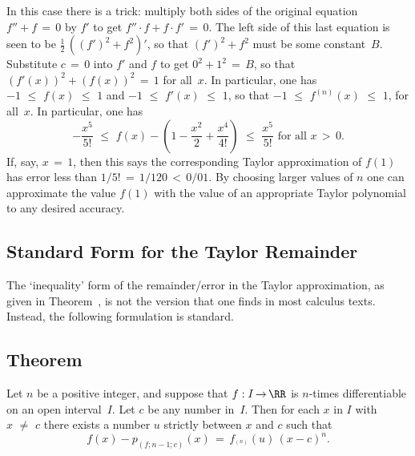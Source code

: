         In this case there is a trick: multiply both sides of the original equation $f'' + f \,=\, 0$ by $f'$ to get $f''{\cdot}f + f{\cdot}f' \,=\, 0$.
    The left side of this last equation is seen to be $\frac{1}{2}\,\left((f')^{2} + f^{2}\right)'$,
    so that $(f')^{2} + f^{2}$ must be some constant~$B$. Substitute $c \,=\, 0$ into $f'$ and $f$
    to get $0^{2} + 1^{2} \,=\, B$, so that $(f'(x))^{2} + (f(x))^{2} \,=\, 1$ for all~$x$.
    In particular, one has $-1\,\,{\leq}\,\,f(x)\,\,{\leq}\,\,1$ and $-1\,\,{\leq}\,\,f'(x)\,\,{\leq}\,\,1$,
    so that $-1\,\,{\leq}\,\,f^{(n)}(x)\,\,{\leq}\,\,1$, for all~$x$. In particular, one has
        \begin{displaymath}
        -\frac{x^{5}}{5!}\,\,{\leq}\,\,f(x)-\left(1 - \frac{x^{2}}{2} + \frac{x^{4}}{4!}\right)\,\,{\leq}\,\,\frac{x^{5}}{5!} \mbox{ for all $x\,>\,0$}.
        \end{displaymath}
    If, say, $x \,=\, 1$, then this says the corresponding Taylor approximation of $f(1)$ has error less than $1/5! \,=\, 1/120\,<\,0/01$.
    By choosing larger values of $n$ one can approximate the value $f(1)$ with the value of an appropriate Taylor polynomial to any desired accuracy.
    
\V

                \subsection{{\bf Standard Form for the Taylor Remainder}}
                \label{subectE40.70}

\VV

        The `inequality' form of the remainder/error in the Taylor approximation, as given in Theorem~,
    is not the version that one finds in most calculus texts. Instead, the following formulation is standard.

\V

            \subsection{\small{\bf Theorem}}
            \label{ThmE40.80}

\V

        Let $n$ be a positive integer, and suppose that $f:I \,{\rightarrow}\, {\RR}$ is $n$-times differentiable on an open interval~$I$.
    Let $c$ be any number in~$I$. Then for each $x$ in $I$ with $x \,\,{\neq}\,\, c$ there exists a number $u$ strictly between $x$ and $c$ such that
        \begin{displaymath}
        f(x) - p_{(f;n-1;c)}(x) \,=\, f_{^{(n)}}(u)\,(x-c)^{n}.
        \end{displaymath} 

